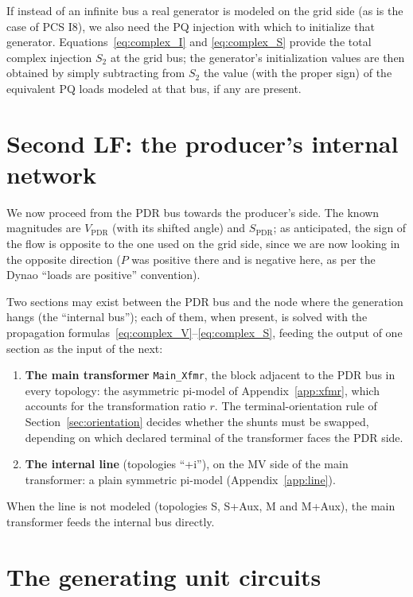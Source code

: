 \documentclass[a4paper,11pt]{article}
\newcommand{\code}[1]{\texttt{#1}}  %
\newcommand{\Dynawo}{Dyna\textomega o} %
\newcommand{\Vpdr}{\ensuremath{V_{\textrm{PDR}}}}
\newcommand{\Spdr}{\ensuremath{S_{\textrm{PDR}}}}
\begin{document}
If instead of an infinite bus a real generator is modeled on the grid side (as is the
case of PCS I8), we also need the PQ injection with which to initialize that generator.
Equations~\eqref{eq:complex_I} and \eqref{eq:complex_S} provide the total complex
injection $S_2$ at the grid bus; the generator's initialization values are then obtained
by simply subtracting from $S_2$ the value (with the proper sign) of the equivalent PQ
loads modeled at that bus, if any are present.




\section{Second LF: the producer's internal network}
\label{sec:internal}

We now proceed from the PDR bus towards the producer's side. The known magnitudes are
$\Vpdr$ (with its shifted angle) and $\Spdr$; as anticipated, the sign of the flow is
opposite to the one used on the grid side, since we are now looking in the opposite
direction ($P$ was positive there and is negative here, as per the \Dynawo{} ``loads are
positive'' convention).

Two sections may exist between the PDR bus and the node where the generation hangs
(the ``internal bus''); each of them, when present, is solved with the propagation
formulas~\eqref{eq:complex_V}--\eqref{eq:complex_S}, feeding the output of one section
as the input of the next:

\begin{enumerate}
\item \textbf{The main transformer} \code{Main\_Xfmr}, the block adjacent to the PDR bus
  in every topology: the asymmetric pi-model of Appendix~\ref{app:xfmr}, which accounts
  for the transformation ratio $r$. The terminal-orientation rule of
  Section~\ref{sec:orientation} decides whether the shunts must be swapped, depending on
  which declared terminal of the transformer faces the PDR side.
\item \textbf{The internal line} (topologies ``+i''), on the MV side of the main
  transformer: a plain symmetric pi-model (Appendix~\ref{app:line}).
\end{enumerate}

When the line is not modeled (topologies S, S+Aux, M and M+Aux), the main transformer
feeds the internal bus directly.




\section{The generating unit circuits}
\label{sec:gencircuits}
\end{document}

